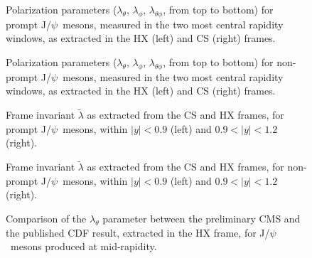 \documentclass[12pt]{article}
\newcommand{\JPsi}{J/$\psi$}
\begin{document}
\begin{figure}[htbp]
\centering
{}
\caption{Polarization parameters ($\lambda_\theta$, $\lambda_\phi$,
  $\lambda_{\theta\phi}$, from top to bottom) for prompt \JPsi\
  mesons, measured in the two most central rapidity windows, as
  extracted in the HX (left) and CS (right) frames.}
\end{figure}

\begin{figure}[htbp]
\centering
{}
\caption{Polarization parameters ($\lambda_\theta$, $\lambda_\phi$,
  $\lambda_{\theta\phi}$, from top to bottom) for non-prompt \JPsi\
  mesons, measured in the two most central rapidity windows, as
  extracted in the HX (left) and CS (right) frames.}
\end{figure}

\begin{figure}[htbp]
\centering
{}
\caption{Frame invariant $\tilde{\lambda}$ as extracted from
  the CS and HX frames, for prompt \JPsi\ mesons, within $|y| < 0.9$ (left)
  and $0.9 < |y| < 1.2$ (right).}
\end{figure}

\begin{figure}[htbp]
\centering
{}
\caption{Frame invariant $\tilde{\lambda}$ as extracted from
  the CS and HX frames, for non-prompt \JPsi\ mesons, within $|y| < 0.9$
  (left) and $0.9 < |y| < 1.2$ (right).}
\end{figure}

\begin{figure}[htbp]
\centering
{}
\caption{Comparison of the $\lambda_\theta$ parameter between the
  preliminary CMS and the published CDF result, extracted in the HX
  frame, for \JPsi\ mesons produced at mid-rapidity.}
\end{figure}
\end{document}
